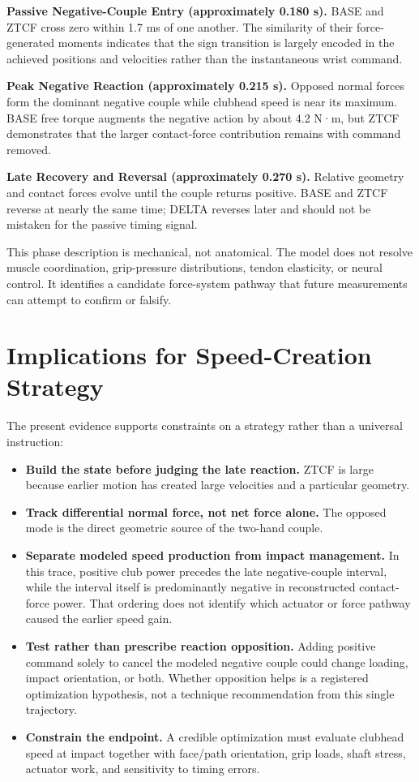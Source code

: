 \documentclass[
  letterpaper,
]{report}
\providecommand{\tightlist}{%
  \setlength{\itemsep}{0pt}\setlength{\parskip}{0pt}}
\begin{document}
\textbf{Passive Negative-Couple Entry (approximately 0.180 s).} BASE and
ZTCF cross zero within 1.7 ms of one another. The similarity of their
force-generated moments indicates that the sign transition is largely
encoded in the achieved positions and velocities rather than the
instantaneous wrist command.

\textbf{Peak Negative Reaction (approximately 0.215 s).} Opposed normal
forces form the dominant negative couple while clubhead speed is near
its maximum. BASE free torque augments the negative action by about 4.2
N·m, but ZTCF demonstrates that the larger contact-force contribution
remains with command removed.

\textbf{Late Recovery and Reversal (approximately 0.270 s).} Relative
geometry and contact forces evolve until the couple returns positive.
BASE and ZTCF reverse at nearly the same time; DELTA reverses later and
should not be mistaken for the passive timing signal.

This phase description is mechanical, not anatomical. The model does not
resolve muscle coordination, grip-pressure distributions, tendon
elasticity, or neural control. It identifies a candidate force-system
pathway that future measurements can attempt to confirm or falsify.

\section{Implications for Speed-Creation
Strategy}\label{sec-two-hand-strategy}

The present evidence supports constraints on a strategy rather than a
universal instruction:

\begin{itemize}
\tightlist
\item
  \textbf{Build the state before judging the late reaction.} ZTCF is
  large because earlier motion has created large velocities and a
  particular geometry.
\item
  \textbf{Track differential normal force, not net force alone.} The
  opposed mode is the direct geometric source of the two-hand couple.
\item
  \textbf{Separate modeled speed production from impact management.} In
  this trace, positive club power precedes the late negative-couple
  interval, while the interval itself is predominantly negative in
  reconstructed contact-force power. That ordering does not identify
  which actuator or force pathway caused the earlier speed gain.
\item
  \textbf{Test rather than prescribe reaction opposition.} Adding
  positive command solely to cancel the modeled negative couple could
  change loading, impact orientation, or both. Whether opposition helps
  is a registered optimization hypothesis, not a technique
  recommendation from this single trajectory.
\item
  \textbf{Constrain the endpoint.} A credible optimization must evaluate
  clubhead speed at impact together with face/path orientation, grip
  loads, shaft stress, actuator work, and sensitivity to timing errors.
\end{itemize}
\end{document}
